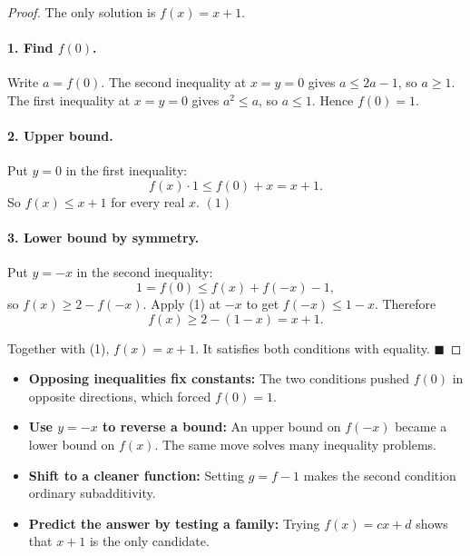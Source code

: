 
\begin{dlsummary}[title={\bfseries Solution 39. The Twin Squeeze at Zero},breakable]

\begin{proof}
The only solution is \(f(x)=x+1\).

\paragraph{1. Find \(f(0)\).} Write \(a=f(0)\). The second inequality at \(x=y=0\) gives \(a\le 2a-1\), so \(a\ge1\). The first inequality at \(x=y=0\) gives \(a^2\le a\), so \(a\le1\). Hence \(f(0)=1\).

\paragraph{2. Upper bound.} Put \(y=0\) in the first inequality:
\[
f(x)\cdot1\le f(0)+x=x+1.
\]
So \(f(x)\le x+1\) for every real \(x\). \((1)\)

\paragraph{3. Lower bound by symmetry.} Put \(y=-x\) in the second inequality:
\[
1=f(0)\le f(x)+f(-x)-1,
\]
so \(f(x)\ge 2-f(-x)\). Apply (1) at \(-x\) to get \(f(-x)\le 1-x\). Therefore
\[
f(x)\ge 2-(1-x)=x+1.
\]

Together with (1), \(f(x)=x+1\). It satisfies both conditions with equality. \(\blacksquare\)
\end{proof}
\end{dlsummary}

\begin{takeaways}
\begin{itemize}
\item \textbf{Opposing inequalities fix constants:} The two conditions pushed \(f(0)\) in opposite directions, which forced \(f(0)=1\).
\item \textbf{Use \(y=-x\) to reverse a bound:} An upper bound on \(f(-x)\) became a lower bound on \(f(x)\). The same move solves many inequality problems.
\item \textbf{Shift to a cleaner function:} Setting \(g=f-1\) makes the second condition ordinary subadditivity.
\item \textbf{Predict the answer by testing a family:} Trying \(f(x)=cx+d\) shows that \(x+1\) is the only candidate.
\end{itemize}
\end{takeaways}
